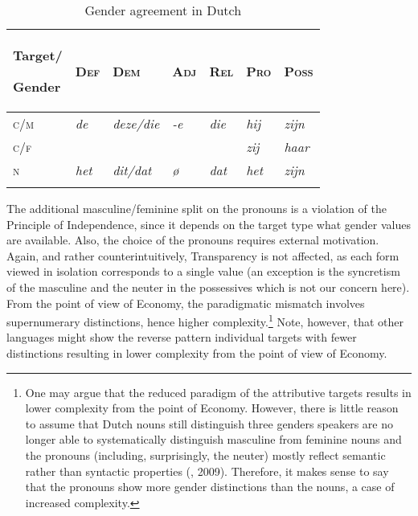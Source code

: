 \documentclass[output=collectionpaper]{langsci/langscibook}
\begin{document}
\begin{table}
\begin{tabularx}{\textwidth}{XXXXXXX}
\lsptoprule
{\bfseries Target/}

\bfseries Gender & \bfseries \textsc{Def} & \bfseries \textsc{Dem} & \bfseries \textsc{Adj} & \bfseries \textsc{Rel} & \bfseries \textsc{Pro} & \bfseries \textsc{Poss}\\
\midrule
\textsc{c/m} & \textit{de} & \textit{deze/die} & \textit{{}-e} & \textit{die} & \textit{hij} & \textit{zijn}\\
\textsc{c/f} &  &  &  &  & \textit{zij} & \textit{haar}\\
\textsc{n} & \textit{het} & \textit{dit/dat} & \textit{ø}\footnotemark{} & \textit{dat} & \textit{het} & \textit{zijn}\\
\lspbottomrule
\end{tabularx}
\caption{Gender agreement in Dutch}
\label{tab:Audr:4}
\end{table}
%

The additional masculine/feminine split on the pronouns is a violation of the Principle of Independence, since it depends on the target type what gender values are available. Also, the choice of the pronouns requires external motivation. Again, and rather counterintuitively, Transparency is not affected, as each form viewed in isolation corresponds to a single value (an exception is the syncretism of the masculine and the neuter in the possessives which is not our concern here). From the point of view of Economy, the paradigmatic mismatch involves supernumerary distinctions, hence higher complexity.\footnote{One may argue that the reduced paradigm of the attributive targets results in lower complexity from the point of Economy. However, there is little reason to assume that Dutch nouns still distinguish three genders \textendash{} speakers are no longer able to systematically distinguish masculine from feminine nouns \textendash{} and the pronouns (including, surprisingly, the neuter) mostly reflect semantic rather than syntactic properties (\citealt{Audring2006}, 2009). Therefore, it makes sense to say that the pronouns show more gender distinctions than the nouns, a case of increased complexity.} Note, however, that other languages might show the reverse pattern \textendash{} individual targets with fewer distinctions \textendash{} resulting in lower complexity from the point of view of Economy.
\end{document}
